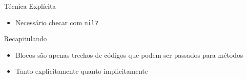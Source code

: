 \begin{frame}{Técnica Explícita}
  \begin{itemize}
    \item Necessário checar com \verb!nil?! 
    
	
  \end{itemize}   
\end{frame}

\begin{frame}[fragile,t]{Recapitulando}
  \begin{itemize}
    \item Blocos são apenas \alert{trechos} de códigos que podem ser passados para métodos
    \item Tanto explicitamente quanto implicitamente
  \end{itemize}
\end{frame}



